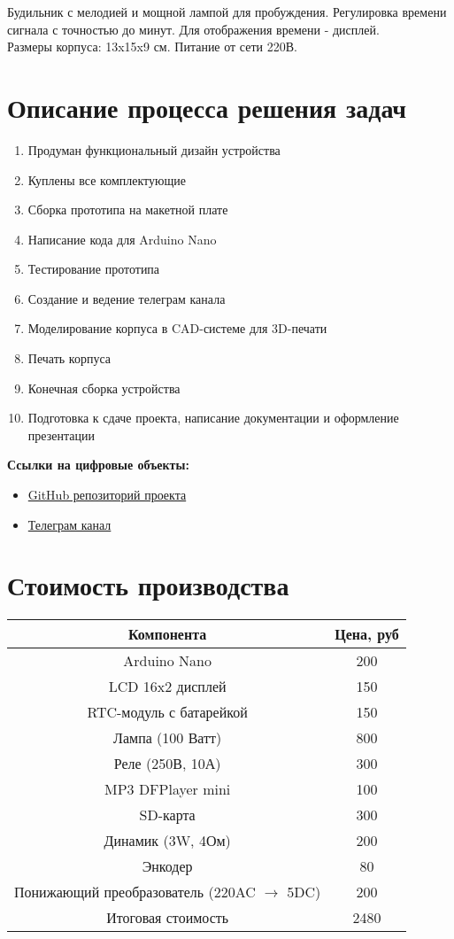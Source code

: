 \documentclass[12pt,a4paper]{article}
\begin{document}
Будильник с мелодией и мощной лампой для пробуждения. Регулировка времени сигнала с точностью до минут. Для отображения времени - дисплей.\\
Размеры корпуса: 13x15x9 см. Питание от сети 220В.

\section{Описание процесса решения задач}

\begin{enumerate}
    \item Продуман функциональный дизайн устройства
    \item Куплены все комплектующие
    \item Сборка прототипа на макетной плате
    \item Написание кода для Arduino Nano
    \item Тестирование прототипа
    \item Создание и ведение телеграм канала
    \item Моделирование корпуса в CAD-системе для 3D-печати
    \item Печать корпуса
    \item Конечная сборка устройства
    \item Подготовка к сдаче проекта, написание документации и оформление презентации
\end{enumerate}

\textbf{Ссылки на цифровые объекты:}
\begin{itemize}
    \item \href{https://github.com/nniikon/ArduinoAlarm}{GitHub репозиторий проекта}
    \item \href{https://t.me/budilnikmipt}{Телеграм канал}
\end{itemize}

\section{Стоимость производства}

\begin{tabular}{|c|c|}
    \hline
    Компонента & Цена, руб \\ \hline
    Arduino Nano & 200 \\ \hline
    LCD 16x2 дисплей & 150 \\ \hline 
    RTC-модуль с батарейкой & 150 \\ \hline
    Лампа (100 Ватт) & 800 \\ \hline
    Реле (250В, 10А) & 300 \\ \hline 
    MP3 DFPlayer mini & 100 \\ \hline 
    SD-карта & 300 \\ \hline
    Динамик (3W, 4Ом) & 200 \\ \hline 
    Энкодер & 80 \\ \hline
    Понижающий преобразователь (220AC $\rightarrow$ 5DC) & 200 \\ \hline
    Итоговая стоимость & 2480 \\ \hline
\end{tabular}
\end{document}
